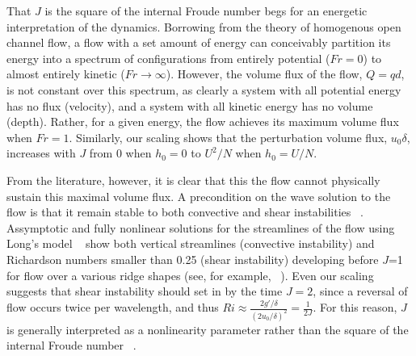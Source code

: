 \documentclass[12pt]{article}
\begin{document}
	That $J$ is the square of the internal Froude number begs for an energetic interpretation of the dynamics. Borrowing from the theory of homogenous open channel flow, a flow with a set amount of energy can conceivably partition its energy into a spectrum of configurations from entirely potential ($Fr=0$) to almost entirely kinetic ($Fr \to \infty$). However, the volume flux of the flow, $Q=qd$, is not constant over this spectrum, as clearly a system with all potential energy has no flux (velocity), and a system with all kinetic energy has no volume (depth). Rather, for a given energy, the flow achieves its maximum volume flux when $Fr=1$. Similarly, our scaling shows that the perturbation volume flux, $u_0\delta$, increases with $J$ from 0 when $h_0=0$ to $U^2/N$ when $h_0=U/N$. 
	
	From the literature, however, it is clear that this the flow cannot physically sustain this maximal volume flux. A precondition on the wave solution to the flow is that it remain stable to both convective and shear instabilities ~\citep{Long1953,Miles1961}. Assymptotic and fully nonlinear solutions for the streamlines of the flow using Long's model ~\citep{Long1953} show both vertical streamlines (convective instability) and Richardson numbers smaller than 0.25 (shear instability) developing before $J$=1 for flow over a various ridge shapes (see, for example, ~\cite{Miles1969,Smith1977,Laprise1989}). Even our scaling suggests that shear instability should set in by the time $J=2$, since a reversal of flow occurs twice per wavelength, and thus $Ri\approx\frac{2g'/\delta}{(2u_0/\delta)^2}=\frac{1}{2J}$. For this reason, $J$ is generally interpreted as a nonlinearity parameter rather than the square of the internal Froude number ~\citep{Miles1969,Baines1995,Aguilar2006,Nikurashin2010a,Eckermann2010}. 
	
	
\end{document}
